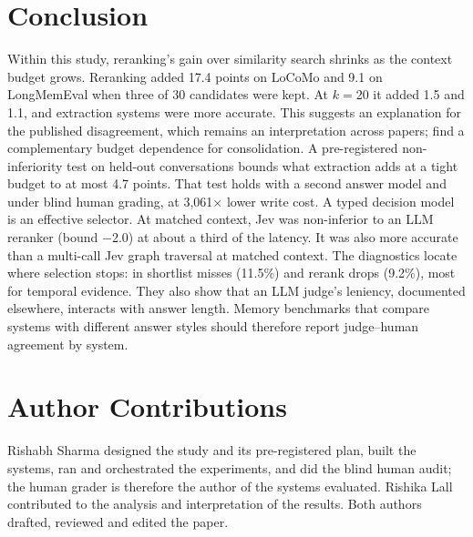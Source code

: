 \documentclass[11pt]{article}
\newcommand{\src}[1]{}
\begin{document}
\section{Conclusion}\label{sec:7}
Within this study, reranking's gain over similarity search shrinks as the context budget grows. Reranking added 17.4\src{bench/results/v3/batch\_a\_report.json\#fresh (T0R k3 - L0 k3)} points on LoCoMo and 9.1\src{bench/results/v3/batch\_c\_report.json\#expansion (T0R 3 - L0 3)} on LongMemEval when three of 30\src{docs/V3\_PLAN.md §1, §2, §4} candidates were kept. At $k{=}$20 it added 1.5\src{bench/results/v3/batch\_a\_report.json\#fresh (T0R k20 - L0 k20)} and 1.1\src{bench/results/v3/batch\_c\_report.json\#expansion (T0R 20 - L0 20)}, and extraction systems were more accurate. This suggests an explanation for the published disagreement, which remains an interpretation across papers; \citet{kang2026retain} find a complementary budget dependence for consolidation. A pre-registered non-inferiority test on held-out conversations bounds what extraction adds at a tight budget to at most 4.7\src{bench/results/v3/human\_audit/audit\_report.json\#lenient/H1\_with\_human\_grades/lower\_bound\_95\_one\_sided (negated)} points. That test holds with a second answer model and under blind human grading, at 3,061\src{bench/results/v3/batch\_b\_report.json\#write\_cost\_ratio\_engram\_over\_t0r/ratio}$\times$ lower write cost. A typed decision model is an effective selector. At matched context, Jev was non-inferior to an LLM reranker (bound $-$2.0\src{bench/results/v3/batch\_b\_report.json\#S4/lower\_bound\_95\_one\_sided}) at about a third of the latency. It was also more accurate than a multi-call Jev graph traversal at matched context. The diagnostics locate where selection stops: in shortlist misses (11.5\%\src{bench/results/v3/shortlist\_recall.json\#all\_nine/all (1 - shortlist\_recall\_any)}) and rerank drops (9.2\%\src{bench/results/v3/shortlist\_recall.json\#all\_nine/all (shortlist\_recall\_any x rerank\_drops\_all\_shortlisted\_evidence)}), most for temporal evidence. They also show that an LLM judge's leniency, documented elsewhere, interacts with answer length. Memory benchmarks that compare systems with different answer styles should therefore report judge--human agreement by system.

\section*{Author Contributions}
Rishabh Sharma designed the study and its pre-registered plan, built the systems, ran and orchestrated the experiments, and did the blind human audit; the human grader is therefore the author of the systems evaluated. Rishika Lall contributed to the analysis and interpretation of the results. Both authors drafted, reviewed and edited the paper.
\end{document}
